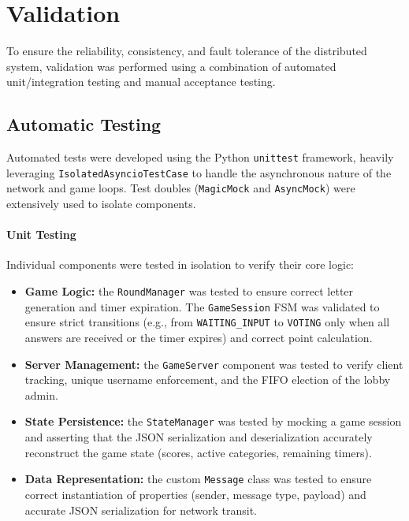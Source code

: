 \documentclass{scrartcl}
\begin{document}
\section{Validation}\label{validation}

To ensure the reliability, consistency, and fault tolerance of the distributed system, validation was performed using a combination of automated unit/integration testing 
and manual acceptance testing.

\subsection{Automatic Testing}\label{automatic-testing}

Automated tests were developed using the Python \texttt{unittest} framework, heavily leveraging \texttt{IsolatedAsyncioTestCase} to handle the asynchronous nature of the network and game loops. 
Test doubles (\texttt{MagicMock} and \texttt{AsyncMock}) were extensively used to isolate components.

\paragraph{Unit Testing}

Individual components were tested in isolation to verify their core logic:
\begin{itemize}
    \item \textbf{Game Logic:} the \texttt{RoundManager} was tested to ensure correct letter generation and timer expiration. 
    The \texttt{GameSession} FSM was validated to ensure strict transitions (e.g., from \texttt{WAITING\_INPUT} to \texttt{VOTING} only when all answers are received or the timer expires) and correct point calculation.
    \item \textbf{Server Management:} the \texttt{GameServer} component was tested to verify client tracking, unique username enforcement, and the FIFO election of the lobby admin.
    \item \textbf{State Persistence:} the \texttt{StateManager} was tested by mocking a game session and asserting that the JSON serialization and deserialization accurately reconstruct the game state 
    (scores, active categories, remaining timers).
    \item \textbf{Data Representation:} the custom \texttt{Message} class was tested to ensure correct instantiation of properties (sender, message type, payload) and accurate JSON serialization for network transit.
\end{itemize}
\end{document}
